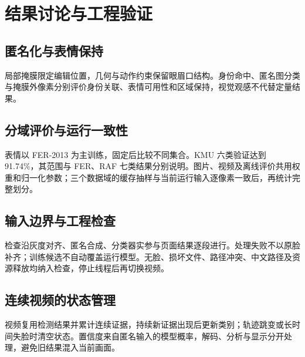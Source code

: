 \section{结果讨论与工程验证}
\label{sec:discussion}
\subsection{匿名化与表情保持}
局部掩膜限定编辑位置，几何与动作约束保留眼眉口结构。身份命中、匿名图分类与掩膜外像素分别评价身份关联、表情可用性和区域保持，视觉观感不代替定量结果。

\subsection{分域评价与运行一致性}
表情以 FER-2013 为主训练，固定后比较不同集合。KMU 六类验证达到 91.74\%，其范围与 FER、RAF 七类结果分别说明。图片、视频及离线评价共用权重和归一化参数；三个数据域的缓存抽样与当前运行输入逐像素一致后，再统计完整划分。

\subsection{输入边界与工程检查}
检查沿灰度对齐、匿名合成、分类器实参与页面结果逐段进行。处理失败不以原脸补齐；训练候选不自动覆盖运行模型。无脸、损坏文件、路径冲突、中文路径及资源释放均纳入检查，停止线程后再切换视频。

\subsection{连续视频的状态管理}
视频复用检测结果并累计连续证据，持续新证据出现后更新类别；轨迹跳变或长时间失脸时清空状态。置信度来自匿名输入的模型概率，解码、分析与显示分开处理，避免旧结果混入当前画面。
